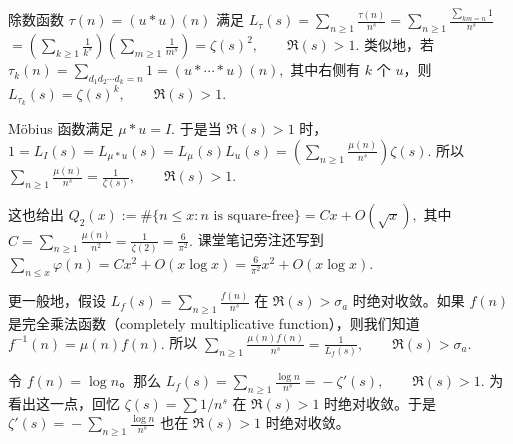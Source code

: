 \begin{example}
	除数函数 $\tau(n)=(u*u)(n)$ 满足
	\(\textstyle L_\tau(s) =\allowbreak{} \sum_{n\geq\allowbreak{} 1}\frac{\tau(n)}{n^s} =\allowbreak{} \sum_{n\geq\allowbreak{} 1}\frac{\sum_{km=\allowbreak{}n}1}{n^s}\) \(\textstyle =\allowbreak{} \left(\sum_{k\geq\allowbreak{} 1}\frac1{k^s}\right) \left(\sum_{m\geq\allowbreak{} 1}\frac1{m^s}\right) =\allowbreak{} \zeta(s)^2,\allowbreak{} \qquad \Re(s)>1.\)
	类似地，若
	\(\textstyle \tau_k(n)=\allowbreak{}\sum_{d_1d_2\cdots d_k=\allowbreak{}n}1=\allowbreak{}(u*\cdots*u)(n),\allowbreak{}\)
	其中右侧有 $k$ 个 $u$，则
	\(\textstyle L_{\tau_k}(s)=\allowbreak{}\zeta(s)^k,\allowbreak{} \qquad \Re(s)>1.\)
\end{example}

\begin{example}
	Möbius 函数满足
	\(\textstyle \mu*u=\allowbreak{}I.\)
	于是当 $\Re(s)>1$ 时，
	\(\textstyle 1=\allowbreak{}L_I(s)=\allowbreak{}L_{\mu*u}(s)=\allowbreak{}L_\mu(s)L_u(s) =\allowbreak{} \left(\sum_{n\geq\allowbreak{} 1}\frac{\mu(n)}{n^s}\right)\zeta(s).\)
	所以
	\(\textstyle \sum_{n\geq\allowbreak{} 1}\frac{\mu(n)}{n^s} =\allowbreak{} \frac1{\zeta(s)},\allowbreak{} \qquad \Re(s)>1.\)
\end{example}

\begin{remark}
	这也给出
	\(\textstyle Q_2(x):=\allowbreak{}\#\{n\leq\allowbreak{} x:n\text{ is square-free}\} =\allowbreak{} Cx+\allowbreak{}O(\sqrt x),\allowbreak{}\)
	其中
	\(\textstyle C=\allowbreak{}\sum_{n\geq\allowbreak{} 1}\frac{\mu(n)}{n^2} =\allowbreak{} \frac1{\zeta(2)} =\allowbreak{} \frac6{\pi^2}.\)
	课堂笔记旁注还写到
	\(\textstyle \sum_{n\leq\allowbreak{} x}\varphi(n) =\allowbreak{} Cx^2+\allowbreak{}O(x\log x) =\allowbreak{} \frac6{\pi^2}x^2+\allowbreak{}O(x\log x).\)
\end{remark}

更一般地，假设
\(\textstyle L_f(s)=\allowbreak{}\sum_{n\geq\allowbreak{} 1}\frac{f(n)}{n^s}\)
在 $\Re(s)>\sigma_a$ 时绝对收敛。如果 $f(n)$ 是完全乘法函数（completely multiplicative function），则我们知道
\(\textstyle f^{-1}(n)=\allowbreak{}\mu(n)f(n).\)
所以
\(\textstyle \sum_{n\geq\allowbreak{} 1}\frac{\mu(n)f(n)}{n^s} =\allowbreak{} \frac1{L_f(s)},\allowbreak{} \qquad \Re(s)>\sigma_a.\)

\begin{example}
	令 $f(n)=\log n$。那么
	\(\textstyle L_f(s)=\allowbreak{}\sum_{n\geq\allowbreak{} 1}\frac{\log n}{n^s} =\allowbreak{} -\zeta'(s),\allowbreak{} \qquad \Re(s)>1.\)
	为看出这一点，回忆 $\zeta(s)=\sum 1/n^s$ 在 $\Re(s)>1$ 时绝对收敛。于是
	\(\textstyle \zeta'(s)=\allowbreak{}-\sum_{n\geq\allowbreak{} 1}\frac{\log n}{n^s}\)
	也在 $\Re(s)>1$ 时绝对收敛。
\end{example}

